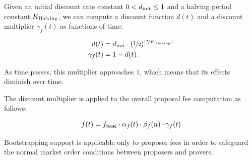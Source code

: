 \documentclass[9pt,oneside]{amsart}
\begin{document}
\begin{multicols}{2}
Given an initial discount rate constant $0 < d_\textnormal{init} \leq 1$ and a halving period constant $K_\textnormal{Halving}$, we can compute a discount function $d(t)$ and a discount multiplier $\gamma_f(t)$ as functions of time:

\begin{align}
d(t) &= d_\textnormal{init}\cdot (\nicefrac{1}{2})^{\lfloor \nicefrac{t}{K_\textnormal{Halving}}\rfloor}
\\
\gamma_f(t)  &= 1-d(t).
\end{align}

As time passes, this multiplier approaches $1$, which means that its effects diminish over time.

The discount multiplier is applied to the overall proposal fee computation as follows: 
% 
% 




\begin{align}
f(t) = f_\textnormal{base} \cdot \alpha_f(t) \cdot \beta_f(n) \cdot \gamma_f(t)
\end{align}

Bootstrapping support is applicable only to proposer fees in order to safeguard the normal market order conditions between proposers and provers.


\end{multicols}
\end{document}
